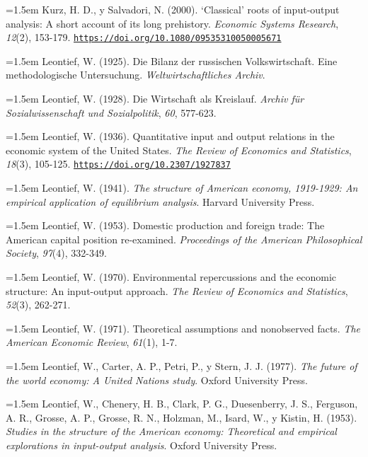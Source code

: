 \documentclass[10pt,a4paper]{article}
\begin{document}
\noindent\hangindent=1.5em Kurz, H. D., y Salvadori, N. (2000). `Classical' roots of input-output analysis: A short account of its long prehistory. \textit{Economic Systems Research}, \textit{12}(2), 153-179. \href{https://doi.org/10.1080/09535310050005671}{\nolinkurl{https://doi.org/10.1080/09535310050005671}}

\noindent\hangindent=1.5em Leontief, W. (1925). Die Bilanz der russischen Volkswirtschaft. Eine methodologische Untersuchung. \textit{Weltwirtschaftliches Archiv}.

\noindent\hangindent=1.5em Leontief, W. (1928). Die Wirtschaft als Kreislauf. \textit{Archiv für Sozialwissenschaft und Sozialpolitik}, \textit{60}, 577-623.

\noindent\hangindent=1.5em Leontief, W. (1936). Quantitative input and output relations in the economic system of the United States. \textit{The Review of Economics and Statistics}, \textit{18}(3), 105-125. \href{https://doi.org/10.2307/1927837}{\nolinkurl{https://doi.org/10.2307/1927837}}

\noindent\hangindent=1.5em Leontief, W. (1941). \textit{The structure of American economy, 1919-1929: An empirical application of equilibrium analysis}. Harvard University Press.

\noindent\hangindent=1.5em Leontief, W. (1953). Domestic production and foreign trade: The American capital position re-examined. \textit{Proceedings of the American Philosophical Society}, \textit{97}(4), 332-349.

\noindent\hangindent=1.5em Leontief, W. (1970). Environmental repercussions and the economic structure: An input-output approach. \textit{The Review of Economics and Statistics}, \textit{52}(3), 262-271.

\noindent\hangindent=1.5em Leontief, W. (1971). Theoretical assumptions and nonobserved facts. \textit{The American Economic Review}, \textit{61}(1), 1-7.

\noindent\hangindent=1.5em Leontief, W., Carter, A. P., Petri, P., y Stern, J. J. (1977). \textit{The future of the world economy: A United Nations study}. Oxford University Press.

\noindent\hangindent=1.5em Leontief, W., Chenery, H. B., Clark, P. G., Duesenberry, J. S., Ferguson, A. R., Grosse, A. P., Grosse, R. N., Holzman, M., Isard, W., y Kistin, H. (1953). \textit{Studies in the structure of the American economy: Theoretical and empirical explorations in input-output analysis}. Oxford University Press.
\end{document}
